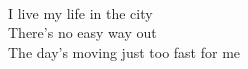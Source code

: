 \\
I live my life in the city \\
There's no easy way out \\
The day's moving just too fast for me \\
